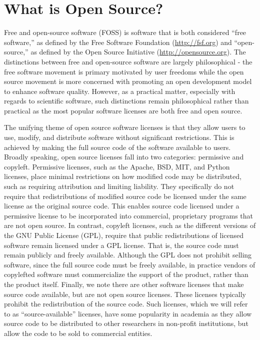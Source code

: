 \section*{What is Open Source?}

Free and open-source software (FOSS) is software that is both considered ``free software,'' as defined by the Free Software Foundation (\url{http://fsf.org}) and ``open-source,'' as defined by the Open Source Initiative (\url{http://opensource.org}).  The distinctions between free and open-source software are largely philosophical  - the free software movement is primary motivated by user freedoms while the open source movement is more concerned with promoting an open development model to enhance software quality.  However, as a practical matter, especially with regards to scientific software, such distinctions remain philosophical rather than practical as the most popular software licenses are both free and open source.  

The unifying theme of open source software licenses is that they allow users to use, modify, and distribute software without significant restrictions.  This is achieved by making the full source code of the software available to users.  Broadly speaking, open source licenses fall into two categories: permissive and copyleft. Permissive licenses, such as the Apache, BSD, MIT, and Python licenses, place minimal restrictions on how modified code may be distributed, such as requiring attribution and limiting liability.  They specifically do not require that redistributions of modified source code be licensed under the same license as the original source code.  This enables source code licensed under a permissive license to be incorporated into commercial, proprietary programs that are not open source.  In contrast, copyleft licenses, such as the different versions of the GNU Public License (GPL), require that public redistributions of licensed software remain licensed under a GPL license.  That is, the source code must remain publicly and freely available. Although the GPL does not prohibit selling software, since the full source code must be freely available, in practice vendors of copylefted software must commercialize the support of the product, rather than the product itself. Finally, we note there are other software licenses that make source code available, but are not open source licenses.  These licenses typically prohibit the redistribution of the source code.  Such licenses, which we will refer to as ``source-available'' licenses, have some popularity in academia as they allow source code to be distributed to other researchers in non-profit institutions, but allow the code to be sold to commercial entities.



